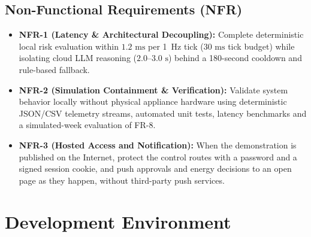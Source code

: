 \documentclass[conference]{IEEEtran}
\begin{document}
\subsection{Non-Functional Requirements (NFR)}
\begin{itemize}
    \item \textbf{NFR-1 (Latency \& Architectural Decoupling):} Complete deterministic local risk evaluation within $1.2\text{ ms}$ per 1~Hz tick ($30\text{ ms}$ tick budget) while isolating cloud LLM reasoning ($2.0\text{--}3.0\text{ s}$) behind a 180-second cooldown and rule-based fallback.
    \item \textbf{NFR-2 (Simulation Containment \& Verification):} Validate system behavior locally without physical appliance hardware using deterministic JSON/CSV telemetry streams, automated unit tests, latency benchmarks and a simulated-week evaluation of FR-8.
    \item \textbf{NFR-3 (Hosted Access and Notification):} When the demonstration is published on the Internet, protect the control routes with a password and a signed session cookie, and push approvals and energy decisions to an open page as they happen, without third-party push services.
\end{itemize}

\section{Development Environment}
\end{document}
